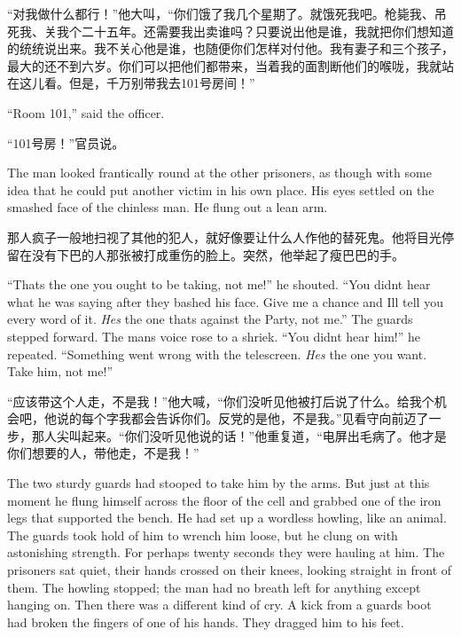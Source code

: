 \begin{paracol}{2}
\switchcolumn

``对我做什么都行！''他大叫，``你们饿了我几个星期了。就饿死我吧。枪毙我、吊死我、关我个二十五年。还需要我出卖谁吗？只要说出他是谁，我就把你们想知道的统统说出来。我不关心他是谁，也随便你们怎样对付他。我有妻子和三个孩子，最大的还不到六岁。你们可以把他们都带来，当着我的面割断他们的喉咙，我就站在这儿看。但是，千万别带我去101号房间！''

\switchcolumn*

``Room 101,'' said the officer.

\switchcolumn

``101号房！''官员说。

\switchcolumn*

The man looked frantically round at the other prisoners, as though with
some idea that he could put another victim in his own place. His eyes
settled on the smashed face of the chinless man. He flung out a lean
arm.

\switchcolumn

那人疯子一般地扫视了其他的犯人，就好像要让什么人作他的替死鬼。他将目光停留在没有下巴的人那张被打成重伤的脸上。突然，他举起了瘦巴巴的手。

\switchcolumn*

``That\textquotesingle s the one you ought to be taking, not me!'' he
shouted. ``You didn\textquotesingle t hear what he was saying after they
bashed his face. Give me a chance and I\textquotesingle ll tell you
every word of it. \emph{He\textquotesingle s} the one
that\textquotesingle s against the Party, not me.'' The guards stepped
forward. The man\textquotesingle s voice rose to a shriek. ``You
didn\textquotesingle t hear him!'' he repeated. ``Something went wrong
with the telescreen. \emph{He\textquotesingle s} the one you want. Take
him, not me!''

\switchcolumn

``应该带这个人走，不是我！''他大喊，``你们没听见他被打后说了什么。给我个机会吧，他说的每个字我都会告诉你们。反党的是他，不是我。''见看守向前迈了一步，那人尖叫起来。``你们没听见他说的话！''他重复道，``电屏出毛病了。他才是你们想要的人，带他走，不是我！''

\switchcolumn*

The two sturdy guards had stooped to take him by the arms. But just at
this moment he flung himself across the floor of the cell and grabbed
one of the iron legs that supported the bench. He had set up a wordless
howling, like an animal. The guards took hold of him to wrench him
loose, but he clung on with astonishing strength. For perhaps twenty
seconds they were hauling at him. The prisoners sat quiet, their hands
crossed on their knees, looking straight in front of them. The howling
stopped; the man had no breath left for anything except hanging on. Then
there was a different kind of cry. A kick from a guard\textquotesingle s
boot had broken the fingers of one of his hands. They dragged him to his
feet.


\end{paracol}
